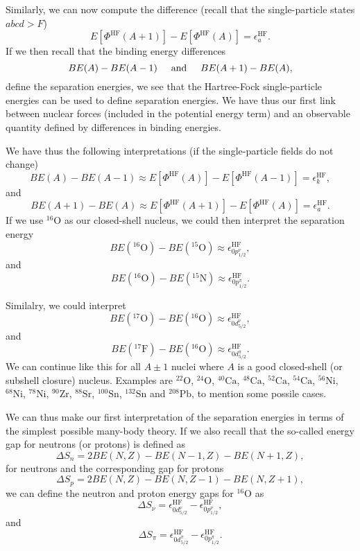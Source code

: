\documentclass[%
oneside,                 %
final,                   %
10pt]{article}
\begin{document}
Similarly, we can now compute the difference (recall that the single-particle states $abcd > F$)
\[
  E[\Phi^{\mathrm{HF}}(A+1)]-   E[\Phi^{\mathrm{HF}}(A)]= \epsilon_a^{\mathrm{HF}}. 
\]
If we then recall that the binding energy differences 
\[
BE(A)-BE(A-1) \hspace{0.5cm} \mathrm{and} \hspace{0.5cm} BE(A+1)-BE(A), 
\]
define the separation energies, we see that the Hartree-Fock single-particle energies can be used to
define separation energies. We have thus our first link between nuclear forces (included in the potential energy term) and an observable quantity defined by differences in binding energies. 

We have thus the following interpretations (if the single-particle fields do not change)
\[
BE(A)-BE(A-1)\approx  E[\Phi^{\mathrm{HF}}(A)]-   E[\Phi^{\mathrm{HF}}(A-1)] 
  = \epsilon_k^{\mathrm{HF}}, 
\]
and
\[
BE(A+1)-BE(A)\approx  E[\Phi^{\mathrm{HF}}(A+1)]-   E[\Phi^{\mathrm{HF}}(A)] =  \epsilon_a^{\mathrm{HF}}. 
\]
If  we use $^{16}\mbox{O}$ as our closed-shell nucleus, we could then interpret the separation energy
\[
BE(^{16}\mathrm{O})-BE(^{15}\mathrm{O})\approx \epsilon_{0p^{\nu}_{1/2}}^{\mathrm{HF}}, 
\]
and
\[
BE(^{16}\mathrm{O})-BE(^{15}\mathrm{N})\approx \epsilon_{0p^{\pi}_{1/2}}^{\mathrm{HF}}.
\]

Similalry, we could interpret
\[
BE(^{17}\mathrm{O})-BE(^{16}\mathrm{O})\approx \epsilon_{0d^{\nu}_{5/2}}^{\mathrm{HF}}, 
\]
and 
\[
BE(^{17}\mathrm{F})-BE(^{16}\mathrm{O})\approx\epsilon_{0d^{\pi}_{5/2}}^{\mathrm{HF}}.
\]
We can continue like this for all $A\pm 1$ nuclei where $A$ is a good closed-shell (or subshell closure)
nucleus. Examples are $^{22}\mbox{O}$, $^{24}\mbox{O}$, $^{40}\mbox{Ca}$, $^{48}\mbox{Ca}$, $^{52}\mbox{Ca}$, $^{54}\mbox{Ca}$, $^{56}\mbox{Ni}$, 
$^{68}\mbox{Ni}$, $^{78}\mbox{Ni}$, $^{90}\mbox{Zr}$, $^{88}\mbox{Sr}$, $^{100}\mbox{Sn}$, $^{132}\mbox{Sn}$ and $^{208}\mbox{Pb}$, to mention some possile cases.

We can thus make our first interpretation of the separation energies in terms of the simplest
possible many-body theory. 
If we also recall that the so-called energy gap for neutrons (or protons) is defined as
\[
\Delta S_n= 2BE(N,Z)-BE(N-1,Z)-BE(N+1,Z),
\]
for neutrons and the corresponding gap for protons
\[
\Delta S_p= 2BE(N,Z)-BE(N,Z-1)-BE(N,Z+1),
\]
we can define the neutron and proton energy gaps for $^{16}\mbox{O}$ as
\[
\Delta S_{\nu}=\epsilon_{0d^{\nu}_{5/2}}^{\mathrm{HF}}-\epsilon_{0p^{\nu}_{1/2}}^{\mathrm{HF}}, 
\]
and 
\[
\Delta S_{\pi}=\epsilon_{0d^{\pi}_{5/2}}^{\mathrm{HF}}-\epsilon_{0p^{\pi}_{1/2}}^{\mathrm{HF}}. 
\]
\end{document}
